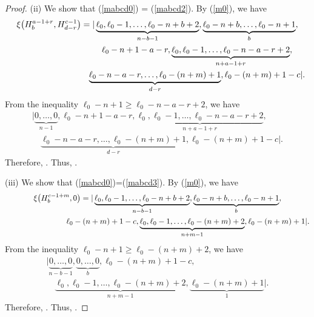 \documentclass[pdftex]{sigma}
\numberwithin{equation}{section}
\begin{document}
\begin{proof}
(ii) We show that (\ref{mabcd0}) = (\ref{mabcd2}). By (\ref{m0}), we have
\begin{gather*}
\xi\bigl(H^{a-1+r}_{b},H^{c-1}_{d-r}\bigr)=|\underbrace{\ell_{0},\ell_{0}-1,\dots,\ell_{0}-n+b+2}_{n-b-1},\underbrace{\ell_{0}-n+b,\dots,\ell_{0}-n+1}_{b},\\
\hphantom{\xi\bigl(H^{a-1+r}_{b},H^{c-1}_{d-r}\bigr)=|}{}
\,\ell_{0}-n+1-a-r,\underbrace{\ell_{0},\ell_{0}-1,\dots,\ell_{0}-n-a-r+2}_{n+a-1+r},\\
\hphantom{\xi\bigl(H^{a-1+r}_{b},H^{c-1}_{d-r}\bigr)=|}{}
\underbrace{\ell_{0}-n-a-r,\dots,\ell_{0}-(n+m)+1}_{d-r},\ell_{0}-(n+m)+1-c|.
\end{gather*}
From the inequality $\ell_0-n+1\geq\ell_0-n-a-r+2$, we have
\begin{gather*}
|\underbrace{0,\dots,0}_{n-1},\ell_{0}-n+1-a-r,\underbrace{\ell_{0},\ell_{0}-1,\dots,\ell_{0}-n-a-r+2}_{n+a-1+r},\nonumber\\
\quad{}\underbrace{\ell_{0}-n-a-r,\dots,\ell_{0}-(n+m)+1}_{d-r},\ell_{0}-(n+m)+1-c|\nonumber.
\end{gather*}
Therefore, . Thus, .


(iii) We show that (\ref{mabcd0})=(\ref{mabcd3}). By (\ref{m0}), we have
\begin{gather*}
\xi\bigl(H^{c-1+m}_{b},0\bigr)=|\underbrace{\ell_{0},\ell_{0}-1,\dots,\ell_{0}-n+b+2}_{n-b-1},%
\underbrace{\ell_{0}-n+b,\dots,\ell_{0}-n+1}_{b},\nonumber\\
\hphantom{\xi\bigl(H^{c-1+m}_{b},0\bigr)=|}{}
\,\ell_{0}-(n+m)+1-c,\underbrace{\ell_{0},\ell_{0}-1,\dots,\ell_{0}-(n+m)+2}_{n+m-1},%
\ell_{0}-(n+m)+1|\nonumber.
\end{gather*}
From the inequality $\ell_{0}-n+1\geq \ell_0-(n+m)+2$, we have
\begin{gather*}
|\underbrace{0,\dots,0}_{n-b-1},
\underbrace{0,\dots,0}_{b},\ell_{0}-(n+m)+1-c,\nonumber\\
\quad{}\underbrace{\ell_{0},\ell_{0}-1,\dots,\ell_{0}-(n+m)+2}_{n+m-1},%
\underbrace{\ell_{0}-(n+m)+1}_{1}|\nonumber.
\end{gather*}
Therefore, . Thus, .


\end{proof}
\end{document}
